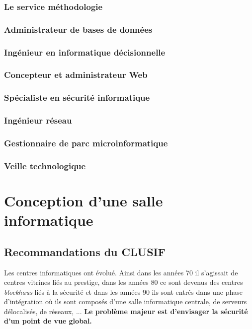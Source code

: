 \documentclass[10pt,a4paper,oneside,titlepage]{report}
\newcommand{\titre}[1]{\textcolor{title}{#1}}
\newcommand{\newterm}[1]{\textit{#1}}
\newcommand{\strong}[1]{\textbf{\titre{#1}}}
\begin{document}
\subsubsection{Le service méthodologie}

\subsubsection{Administrateur de bases de données}

\subsubsection{Ingénieur en informatique décisionnelle}

\subsubsection{Concepteur et administrateur Web}

\subsubsection{Spécialiste en sécurité informatique}

\subsubsection{Ingénieur réseau}

\subsubsection{Gestionnaire de parc microinformatique}

\subsubsection{Veille technologique}

\section{Conception d'une salle informatique}

\subsection{Recommandations du CLUSIF}

Les centres informatiques ont évolué. Ainsi dans les années 70 il s'agissait de centres vitrines liés au prestige, dans les années 80 ce sont devenus des centres
\newterm{blockhaus} liés à la sécurité et dans les années 90 ils sont entrés dans une phase d'intégration où ils sont composés d'une salle informatique centrale, de
serveurs délocalisés, de réseaux, ... \strong{Le problème majeur est d'envisager la sécurité d'un point de vue global.} \\
\end{document}
